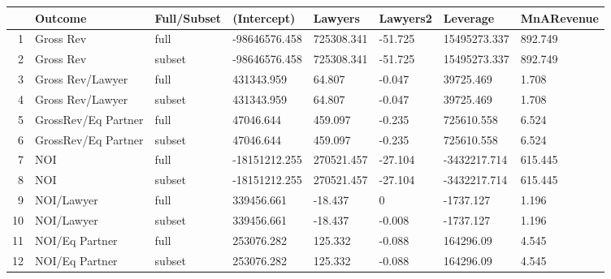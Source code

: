 \begin{table}[ht]
\centering
\begin{tabular}{rlllllll}
  \hline
 & Outcome & Full/Subset & (Intercept) & Lawyers & Lawyers2 & Leverage & MnARevenue \\ 
  \hline
1 & Gross Rev & full & -98646576.458 & 725308.341 & -51.725 & 15495273.337 & 892.749 \\ 
  2 & Gross Rev & subset & -98646576.458 & 725308.341 & -51.725 & 15495273.337 & 892.749 \\ 
  3 & Gross Rev/Lawyer & full & 431343.959 & 64.807 & -0.047 & 39725.469 & 1.708 \\ 
  4 & Gross Rev/Lawyer & subset & 431343.959 & 64.807 & -0.047 & 39725.469 & 1.708 \\ 
  5 & GrossRev/Eq Partner & full & 47046.644 & 459.097 & -0.235 & 725610.558 & 6.524 \\ 
  6 & GrossRev/Eq Partner & subset & 47046.644 & 459.097 & -0.235 & 725610.558 & 6.524 \\ 
  7 & NOI & full & -18151212.255 & 270521.457 & -27.104 & -3432217.714 & 615.445 \\ 
  8 & NOI & subset & -18151212.255 & 270521.457 & -27.104 & -3432217.714 & 615.445 \\ 
  9 & NOI/Lawyer & full & 339456.661 & -18.437 & 0 & -1737.127 & 1.196 \\ 
  10 & NOI/Lawyer & subset & 339456.661 & -18.437 & -0.008 & -1737.127 & 1.196 \\ 
  11 & NOI/Eq Partner & full & 253076.282 & 125.332 & -0.088 & 164296.09 & 4.545 \\ 
  12 & NOI/Eq Partner & subset & 253076.282 & 125.332 & -0.088 & 164296.09 & 4.545 \\ 
   \hline
\end{tabular}
\end{table}
